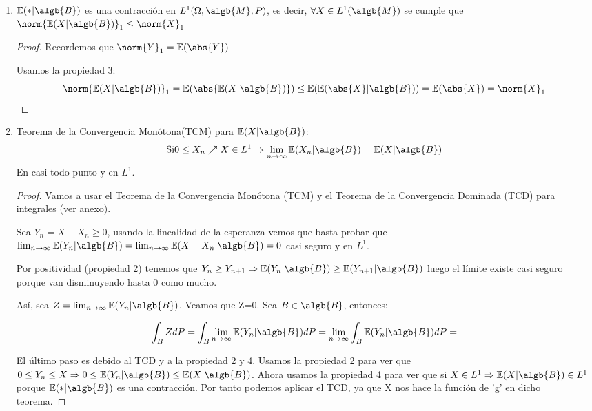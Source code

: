 \documentclass{apuntes}
\begin{document}
\begin{enumerate}
\begin{proof}
\end{proof} 
\item $\mathbb{E}(*|\algb{B})$ es una contracción en $L^1(\Omega, \algb{M},P)$, es decir, $\forall X \in L^1(\algb{M})$ se cumple que $\norm{\mathbb{E}(X|\algb{B})}_1 \leq \norm{X}_1$

\begin{proof}

Recordemos que $\norm{Y}_1 = \mathbb{E}(\abs{Y})$

Usamos la propiedad 3:
\[\norm{\mathbb{E}(X|\algb{B})}_1=
\mathbb{E}(\abs{\mathbb{E}(X|\algb{B})}) \leq \mathbb{E}(\mathbb{E}(\abs{X}|\algb{B})) = \mathbb{E}(\abs{X}) = \norm{X}_1
\]
\end{proof}
\item Teorema de la Convergencia Monótona(TCM) para $\mathbb{E}(X|\algb{B})$:
\[
\text{Si} 0\leq X_n \nearrow X \in L^1 \Rightarrow \lim_{n \rightarrow \infty} \mathbb{E}(X_n|\algb{B}) = \mathbb{E}(X|\algb{B})
\]
En casi todo punto y en $L^1$.

\begin{proof}
Vamos a usar el Teorema de la Convergencia Monótona (TCM) y el Teorema de la Convergencia Dominada (TCD) para integrales (ver anexo).

Sea $Y_n=X-X_n \geq 0$, usando la linealidad de la esperanza vemos que basta probar que $\lim_{n \rightarrow \infty} \mathbb{E}(Y_n|\algb{B})= \lim_{n \rightarrow \infty} \mathbb{E}(X-X_n|\algb{B}) = 0$ casi seguro y en $L^1$.

Por positividad (propiedad 2) tenemos que $Y_n \geq Y_{n+1} \Rightarrow \mathbb{E}(Y_n|\algb{B}) \geq \mathbb{E}(Y_{n+1}|\algb{B})$ luego el límite existe casi seguro porque van disminuyendo hasta 0 como mucho.

Así, sea $Z=\lim_{n \rightarrow \infty} \mathbb{E}(Y_n|\algb{B})$. Veamos que Z=0. Sea $B \in \algb{B}$, entonces:

\[
\int_B ZdP= \int_B \lim_{n \rightarrow \infty}\mathbb{E}(Y_n|\algb{B})dP= \lim_{n \rightarrow \infty}\int_B \mathbb{E}(Y_n|\algb{B})dP = 
\]

El último paso es debido al TCD y a la propiedad 2 y 4. Usamos la propiedad 2 para ver que $0 \leq Y_n \leq X \Rightarrow 0 \leq \mathbb{E}(Y_n|\algb{B}) \leq \mathbb{E}(X|\algb{B})$.  Ahora usamos la propiedad 4 para ver que si $X\in L^1 \Rightarrow \mathbb{E}(X|\algb{B})\in L^1$ porque $\mathbb{E}(*|\algb{B})$ es una contracción. Por tanto podemos aplicar el TCD, ya que X nos hace la función de 'g' en dicho teorema.


\end{proof}
\end{enumerate}
\end{document}

